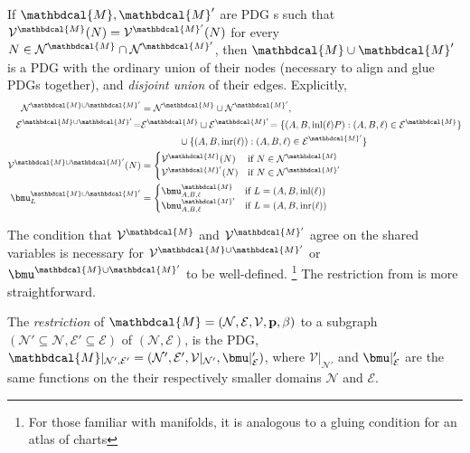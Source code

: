 \documentclass[letterpaper]{article} %
\theoremstyle{plain}
\theoremstyle{definition}
\theoremstyle{remark}
\newcommand\mat[1]{\mathbf{#1}}
\newcommand{\notation}[2][]{#1}
\renewcommand{\notation}[2][]{{\color{notationcolor} #2}}
\newcommand{\vfullfootnote}[1]{}
\renewcommand{\vfullfootnote}[1]{\footnote{#1}}
\newcommand{\V}{\mathcal V}
\newcommand{\N}{\mathcal N}
\newcommand{\Ed}{\mathcal E}
\newcommand{\pdgvars}[1][]{(\N#1, \Ed#1, \V#1, \mat p#1, \beta#1)}
\newcommand{\dg}[1]{\mathbdcal{#1}}
\begin{document}
\begin{vfull}
\begin{defn}[union] \label{def:model-union}
	If $\dg M, \dg M'$ are PDG s such that $\V^\dg M(N) = \V^{\dg M'}(N)$ for every $N \in  \N^{\dg M} \cap \N^{\dg M'}$, then $\dg M \cup \dg M'$ is a PDG with the ordinary union of their nodes (necessary to align and glue PDGs together), and \emph{disjoint union} of their edges. \notation{Explicitly,
	\begin{align*}
		\N^{\dg M \cup \dg M'} &= \N^\dg M \cup \N^{\dg M'},  \\
		\Ed^{\dg M \cup \dg M'} \!=& \Ed^\dg M \sqcup \Ed^{\dg M'}\!
			=  \{ (A, B, \text{inl}(\ell)P) : (A,B,\ell)\in \Ed^\dg M \}  \\
				&\qquad\qquad \cup \{ (A, B, \text{inr}(\ell)) : (A,B,\ell)\in \Ed^{\dg M'} \} \\ 
		\V^{\dg M \cup \dg M'} (N) &= \begin{cases}
				\V^{\dg M}(N) & \text{if }N \in \N^\dg M \\
				\V^{\dg M'}(N) &\text{if }N \in \N^{\dg M'} 
			\end{cases}\\
		\bmu^{\dg M \cup \dg M'}_L &= \begin{cases}
			\bmu^{\dg M}_{A, B, \ell} &\text{if } L = (A, B, \text{inl} (\ell)) \\
			\bmu^{\dg M'}_{A, B, \ell} &\text{if } L = (A, B, \text{inr} (\ell)) 
		\end{cases}
	\end{align*}}
\end{defn}
The condition that $\V^\dg M$ and $\V^{\dg M'}$ agree on the shared variables is necessary for $\V^{\dg M\cup \dg M'}$ or $\bmu^{\dg M \cup \dg M'}$ to be well-defined.%
	\vfullfootnote{For those familiar with manifolds, it is analogous to a gluing condition for an atlas of charts}
The restriction from  is more straightforward.%

\begin{defn}[restriction]\label{def:restriction}
	The \emph{restriction} of $\dg M = \pdgvars[]$ to a subgraph $(\N' \subseteq \N, \Ed' \subseteq \Ed)$ of $(\N, \Ed)$, is the PDG, $\dg M|_{\N', \Ed'} = (\N', \Ed', \V |_{\N'}, \bmu|_\Ed')$, where 
	$\V|_{\N'}$ and $\bmu|_\Ed'$ are the same functions on the their respectively smaller domains $\N$ and $\Ed$. 
\end{defn}




\end{vfull}
\end{document}
